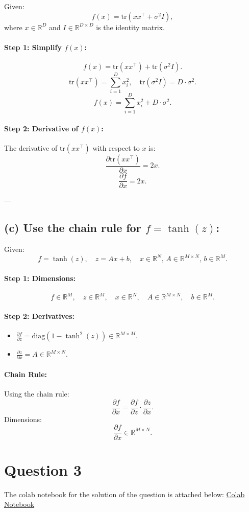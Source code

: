 \documentclass{article}
\begin{document}
Given:
\[
f(x) = \text{tr}(xx^\top + \sigma^2 I),
\]
where \(x \in \mathbb{R}^D\) and \(I \in \mathbb{R}^{D \times D}\) is the identity matrix.

\paragraph{Step 1: Simplify \(f(x)\):}
\[
f(x) = \text{tr}(xx^\top) + \text{tr}(\sigma^2 I).
\]
\[
\text{tr}(xx^\top) = \sum_{i=1}^D x_i^2, \quad \text{tr}(\sigma^2 I) = D \cdot \sigma^2.
\]
\[
f(x) = \sum_{i=1}^D x_i^2 + D \cdot \sigma^2.
\]

\paragraph{Step 2: Derivative of \(f(x)\):}
The derivative of \(\text{tr}(xx^\top)\) with respect to \(x\) is:
\[
\frac{\partial \text{tr}(xx^\top)}{\partial x} = 2x.
\]
\[
\frac{\partial f}{\partial x} = 2x.
\]

---

\subsection*{(c) Use the chain rule for \(f = \tanh(z)\):}

Given:
\[
f = \tanh(z), \quad z = Ax + b, \quad x \in \mathbb{R}^N, \, A \in \mathbb{R}^{M \times N}, \, b \in \mathbb{R}^M.
\]

\paragraph{Step 1: Dimensions:}
\[
f \in \mathbb{R}^M, \quad z \in \mathbb{R}^M, \quad x \in \mathbb{R}^N, \quad A \in \mathbb{R}^{M \times N}, \quad b \in \mathbb{R}^M.
\]

\paragraph{Step 2: Derivatives:}
\begin{itemize}
    \item \(\frac{\partial f}{\partial z} = \text{diag}(1 - \tanh^2(z)) \in \mathbb{R}^{M \times M}\).
    \item \(\frac{\partial z}{\partial x} = A \in \mathbb{R}^{M \times N}\).
\end{itemize}

\paragraph{Chain Rule:}
Using the chain rule:
\[
\frac{\partial f}{\partial x} = \frac{\partial f}{\partial z} \cdot \frac{\partial z}{\partial x}.
\]
Dimensions:
\[
\frac{\partial f}{\partial x} \in \mathbb{R}^{M \times N}.
\]








\section{Question 3}

The colab notebook for the solution of the question is attached below:
\href{https://colab.research.google.com/drive/1wwd6boNGOdFm88OwarMbC4dLGmsv5qHH?usp=sharing}{Colab Notebook}
\end{document}
